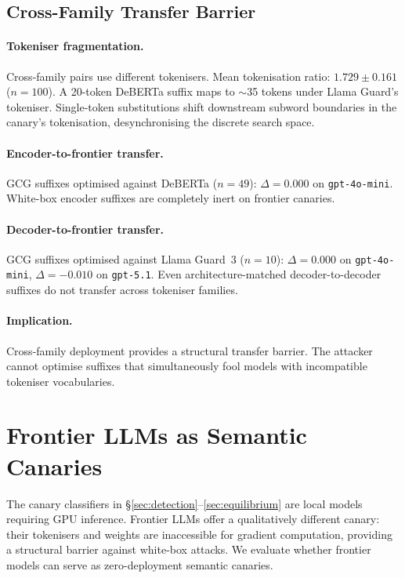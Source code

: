 \documentclass{article}
\begin{document}
\subsection{Cross-Family Transfer Barrier}
\label{sec:transfer-barrier}

\paragraph{Tokeniser fragmentation.} Cross-family pairs use different tokenisers. Mean tokenisation ratio: $1.729 \pm 0.161$ ($n{=}100$). A 20-token DeBERTa suffix maps to $\sim$35 tokens under Llama Guard's tokeniser. Single-token substitutions shift downstream subword boundaries in the canary's tokenisation, desynchronising the discrete search space.

\paragraph{Encoder-to-frontier transfer.} GCG suffixes optimised against DeBERTa ($n{=}49$): $\Delta = 0.000$ on \texttt{gpt-4o-mini}. White-box encoder suffixes are completely inert on frontier canaries.

\paragraph{Decoder-to-frontier transfer.} GCG suffixes optimised against Llama Guard~3 ($n{=}10$): $\Delta = 0.000$ on \texttt{gpt-4o-mini}, $\Delta = -0.010$ on \texttt{gpt-5.1}. Even architecture-matched decoder-to-decoder suffixes do not transfer across tokeniser families.

\paragraph{Implication.} Cross-family deployment provides a structural transfer barrier. The attacker cannot optimise suffixes that simultaneously fool models with incompatible tokeniser vocabularies.


\section{Frontier LLMs as Semantic Canaries}
\label{sec:frontier}

The canary classifiers in \S\ref{sec:detection}--\ref{sec:equilibrium} are local models requiring GPU inference. Frontier LLMs offer a qualitatively different canary: their tokenisers and weights are inaccessible for gradient computation, providing a structural barrier against white-box attacks. We evaluate whether frontier models can serve as zero-deployment semantic canaries.
\end{document}
